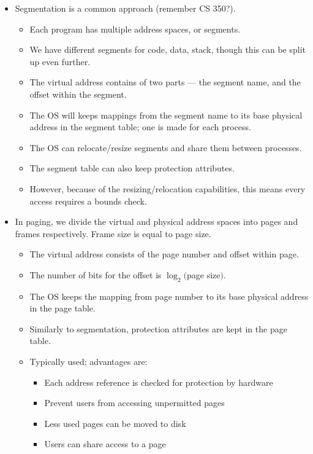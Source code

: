 \documentclass{article}
\begin{document}
\begin{itemize}
\begin{itemize}
        \end{itemize}
    \item Segmentation is a common approach (remember CS 350?).
        \begin{itemize}
            \item Each program has multiple address spaces, or segments.
            \item We have different segments for code, data, stack, though this can be split up even further.
            \item The virtual address contains of two parts --- the segment name, and the offset within the segment.
            \item The OS will keeps mappings from the segment name to its base physical address in the segment table; one is made for each process.
            \item The OS can relocate/resize segments and share them between processes.
            \item The segment table can also keep protection attributes.
            \item However, because of the resizing/relocation capabilities, this means every access requires a bounds check.
        \end{itemize}
    \item In paging, we divide the virtual and physical address spaces into pages and frames respectively.  Frame size is equal to page size.
        \begin{itemize}
            \item The virtual address consists of the page number and offset within page.
            \item The number of bits for the offset is $\log_2($page size$)$.
            \item The OS keeps the mapping from page number to its base physical address in the page table.
            \item Similarly to segmentation, protection attributes are kept in the page table.
            \item Typically used; advantages are:
                \begin{itemize}
                    \item Each address reference is checked for protection by hardware
                    \item Prevent users from accessing unpermitted pages
                    \item Less used pages can be moved to disk
                    \item Users can share access to a page

\end{itemize}
\end{itemize}
\end{itemize}
\end{document}
